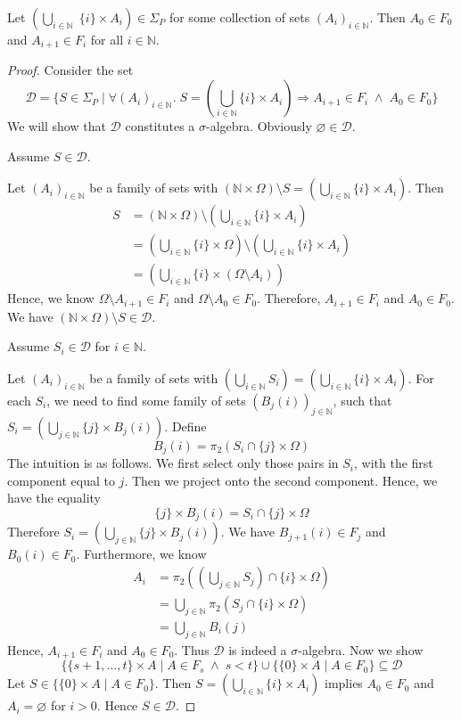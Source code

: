 \begin{theorem}
	Let $(\bigcup_{i \in \mathbb{N}} \; \{i\} \times A_i) \in \Sigma_P$ for some collection of sets $(A_i)_{i \in \mathbb{N}}$. Then $A_0 \in F_0$ and $A_{i+1} \in F_i$ for all $i \in \mathbb{N}$.
\end{theorem}
\begin{proof}
	Consider the set 
	\[
		\mathcal{D} = \{S \in \Sigma_P \;\vert\; \forall (A_i)_{i \in \mathbb{N}}. \; S = (\bigcup_{i \in \mathbb{N}} \{i\} \times A_i) \Longrightarrow A_{i+1} \in F_i \;\wedge\; A_0 \in F_0 \}
	\]
	We will show that $\mathcal{D}$ constitutes a $\sigma$-algebra. Obviously $\varnothing \in \mathcal{D}$.
	
	Assume $S \in \mathcal{D}$. 
	
	Let $(A_i)_{i \in \mathbb{N}}$ be a family of sets with $(\mathbb{N} \times \Omega) \setminus S = (\bigcup_{i \in \mathbb{N}} \{i\} \times A_i)$. Then
	\begin{align*}
		S &= (\mathbb{N} \times \Omega) \setminus (\bigcup_{i \in \mathbb{N}} \{i\} \times A_i) \\
		&= (\bigcup_{i \in \mathbb{N}} \{i\} \times \Omega) \setminus (\bigcup_{i \in \mathbb{N}} \{i\} \times A_i) \\
		&= (\bigcup_{i \in \mathbb{N}} \{i\} \times (\Omega \setminus A_i))
	\end{align*}
	Hence, we know $\Omega \setminus A_{i+1} \in F_i$ and $\Omega \setminus A_0 \in F_0$. Therefore, $A_{i+1} \in F_i$ and $A_0 \in F_0$. We have $(\mathbb{N} \times \Omega) \setminus S \in \mathcal{D}$.
	
	Assume $S_i \in \mathcal{D}$ for $i \in \mathbb{N}$. 
	
	Let $(A_i)_{i \in \mathbb{N}}$ be a family of sets with $(\bigcup_{i \in \mathbb{N}} S_i) = (\bigcup_{i \in \mathbb{N}} \{i\} \times A_i)$. For each $S_i$, we need to find some family of sets $(B_j(i))_{j \in \mathbb{N}}$, such that $S_i = (\bigcup_{j \in \mathbb{N}} \{j\} \times B_j(i))$. Define
	\[
		B_j(i) = \pi_2(S_i \cap \{j\} \times \Omega)
	\]
	The intuition is as follows. We first select only those pairs in $S_i$, with the first component equal to $j$. Then we project onto the second component. Hence, we have the equality
	\[
		\{j\} \times B_j(i) = S_i \cap \{j\} \times \Omega
	\]
	Therefore $S_i = (\bigcup_{j \in \mathbb{N}} \{j\} \times B_j(i))$. We have $B_{j+1}(i) \in F_j$ and $B_0(i) \in F_0$. Furthermore, we know
	\begin{align*}
		A_i &= \pi_2\left((\bigcup_{j \in \mathbb{N}} S_j) \cap \{i\} \times \Omega\right) \\
		&= \bigcup_{j \in \mathbb{N}} \pi_2(S_j \cap \{i\} \times \Omega) \\
		&= \bigcup_{j \in \mathbb{N}} B_i(j)
	\end{align*}
	Hence, $A_{i + 1} \in F_i$ and $A_0 \in F_0$. Thus $\mathcal{D}$ is indeed a $\sigma$-algebra. Now we show 
	\[
		\{\{s + 1,\dots, t\} \times A \;\vert\; A \in F_s \;\wedge\; s < t \} \cup \{\{0\} \times A \;\vert\; A \in F_0\} \subseteq \mathcal{D}
	\]
	Let $S \in \{\{0\} \times A \;\vert\; A \in F_0\}$. Then $S = (\bigcup_{i \in \mathbb{N}} \{i\} \times A_i)$ implies $A_0 \in F_0$ and $A_i = \varnothing$ for $i > 0$. Hence $S \in \mathcal{D}$.
	

\end{proof}
